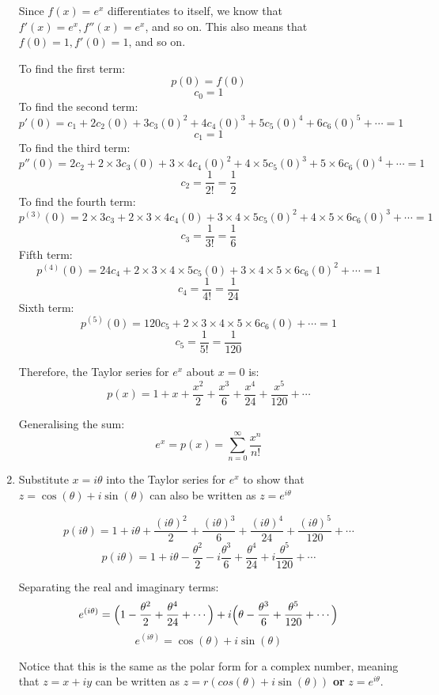\documentclass[../main.tex]{subfiles}
\begin{document}
\begin{enumerate}[itemsep=0.7cm]
    Since $f(x)=e^x$ differentiates to itself, we know that $f'(x)=e^x, f''(x)=e^x$, and so on. This also means that $f(0)=1, f'(0)=1$, and so on.

    To find the first term:
    \[p(0)=f(0)\]
    \[c_0=1\]
    To find the second term:
    \[p'(0)=c_1 + 2c_2(0) + 3c_3(0)^2 + 4c_4(0)^3 + 5c_5(0)^4 + 6c_6(0)^5 + \cdots = 1\]
    \[c_1 = 1\]
    To find the third term:
    \[p''(0)= 2c_2 + 2\times 3c_3(0) + 3\times 4c_4(0)^2 + 4\times 5c_5(0)^3 + 5\times 6c_6(0)^4 + \cdots = 1\]
    \[c_2 = \frac{1}{2!} = \frac{1}{2}\]
    To find the fourth term:
    \[p^{(3)}(0) = 2\times 3c_3 + 2\times 3\times 4c_4(0) + 3\times 4\times 5c_5(0)^2 + 4\times 5\times 6c_6(0)^3 + \cdots =1\]
    \[c_3 = \frac{1}{3!} = \frac{1}{6}\]
    Fifth term:
    \[p^{(4)}(0) = 24c_4 + 2\times 3\times 4\times 5c_5(0) + 3\times 4\times 5\times 6c_6(0)^2 + \cdots =1\]
    \[c_4 = \frac{1}{4!} = \frac{1}{24}\]
    Sixth term:
    \[p^{(5)}(0) = 120c_5 + 2\times 3\times 4\times 5\times 6c_6(0) + \cdots = 1\]
    \[c_5 = \frac{1}{5!} = \frac{1}{120}\]

    Therefore, the Taylor series for $e^x$ about $x=0$ is:
    \[p(x) = 1 + x + \frac{x^2}{2} + \frac{x^3}{6} + \frac{x^4}{24} + \frac{x^5}{120} + \cdots\]

    Generalising the sum:
    \[e^x = p(x) = \sum_{n=0}^{\infty} \frac{x^n}{n!}\]

    \item
    Substitute $x=i\theta$ into the Taylor series for $e^x$ to show that $z=\cos{(\theta)}+i \sin{(\theta)}$ can also be written as $z=e^{i \theta}$

    \[p(i\theta) = 1 + i\theta + \frac{(i\theta)^2}{2} + \frac{(i\theta)^3}{6} + \frac{(i\theta)^4}{24} + \frac{(i\theta)^5}{120} + \cdots\]
    \[p(i\theta) = 1 + i\theta - \frac{\theta^2}{2} - i\frac{\theta^3}{6} + \frac{\theta^4}{24} + i\frac{\theta^5}{120} + \cdots\]

    Separating the real and imaginary terms:
    \[e^{(i\theta)} = \Bigl(1 - \frac{\theta^2}{2} + \frac{\theta^4}{24} +\cdots \Bigr) + i\Bigl(\theta  - \frac{\theta^3}{6}  + \frac{\theta^5}{120} + \cdots \Bigr)\]
    \[e^{(i\theta)} = \cos{(\theta)} + i\sin{(\theta)}\]

    Notice that this is the same as the polar form for a complex number, meaning that $z = x + iy$ can be written as $z=r(cos{(\theta)}+i\sin{(\theta)})$ \textbf{or} $z=e^{i\theta}$.

\end{enumerate}
\end{document}
